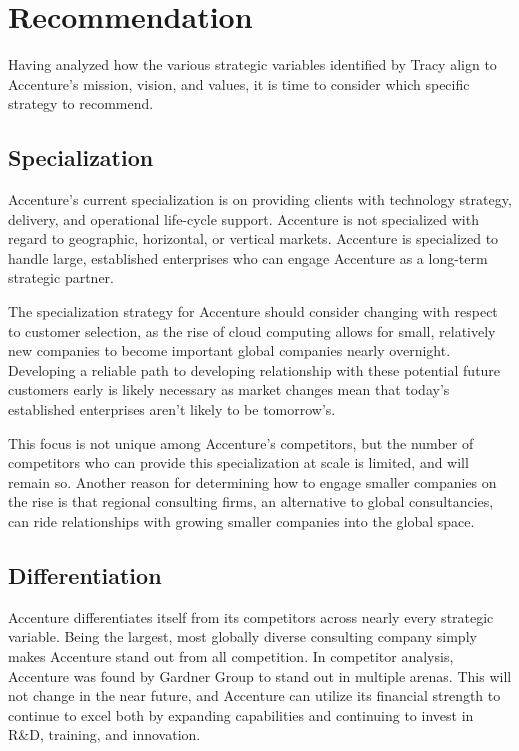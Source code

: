 \section{Recommendation}

Having analyzed how the various strategic variables identified by Tracy align to Accenture's mission, vision, and values, it is time to consider which specific strategy to recommend.

\subsection{Specialization}

Accenture's current specialization is on providing clients with technology strategy, delivery, and operational life-cycle support. Accenture is not specialized with regard to geographic, horizontal, or vertical markets. Accenture is specialized to handle large, established enterprises who can engage Accenture as a long-term strategic partner.

The specialization strategy for Accenture should consider changing with respect to customer selection, as the rise of cloud computing allows for small, relatively new companies to become important global companies nearly overnight. Developing a reliable path to developing relationship with these potential future customers early is likely necessary as market changes mean that today's established enterprises aren't likely to be tomorrow's.

This focus is not unique among Accenture's competitors, but the number of competitors who can provide this specialization at scale is limited, and will remain so. Another reason for determining how to engage smaller companies on the rise is that regional consulting firms, an alternative to global consultancies, can ride relationships with growing smaller companies into the global space.

\subsection{Differentiation}

Accenture differentiates itself from its competitors across nearly every strategic variable. Being the largest, most globally diverse consulting company simply makes Accenture stand out from all competition. In competitor analysis, Accenture was found by Gardner Group to stand out in multiple arenas. This will not change in the near future, and Accenture can utilize its financial strength to continue to excel both by expanding capabilities and continuing to invest in R\&D, training, and innovation.

